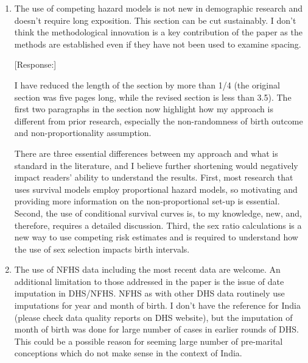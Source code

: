 \documentclass[letterpaper,12pt]{article}
\begin{document}
\begin{enumerate}
[Response:]

As mentioned above, I have refocused the paper to examine how birth spacing has changed
over time in India, and, especially, how the spread of prenatal sex determination can
lead to longer spacing.
As part of this rewrite, I have incorporated the suggested references and other relevant
works into the Introduction as part of the motivation for why examining the changes in 
birth  intervals that arise from the use of sex selection is essential.

\item The use of competing hazard models is not new in demographic research
and doesn’t require long exposition. This section can be cut
sustainably. I don’t think the methodological innovation is a key
contribution of the paper as the methods are established even if they
have not been used to examine spacing.

[Response:]

I have reduced the length of the section by more than 1/4 (the original section was five
pages long, while the revised section is less than 3.5).
The first two paragraphs in the section now highlight how my approach is different from
prior research, especially the non-randomness of birth outcome and non-proportionality
assumption.

There are three essential differences between my approach and what is standard
in the literature, and I believe further shortening would negatively impact readers'
ability to understand the results.
First, most research that uses survival models employ proportional hazard models, so 
motivating and providing more information on the non-proportional set-up is essential.
Second, the use of conditional survival curves is, to my knowledge, new, and, therefore,
requires a detailed discussion.
Third, the sex ratio calculations is a new way to use competing risk estimates and is 
required to understand how the use of sex selection impacts birth intervals.


\item The use of NFHS data including the most recent data are welcome. An
additional limitation to those addressed in the paper is the issue of
date imputation in DHS/NFHS. NFHS as with other DHS data routinely use
imputations for year and month of birth. I don’t have the reference for
India (please check data quality reports on DHS website), but the
imputation of month of birth was done for large number of cases in
earlier rounds of DHS. This could be a possible reason for seeming large
number of pre-marital conceptions which do not make sense in the context
of India.


\end{enumerate}
\end{document}
